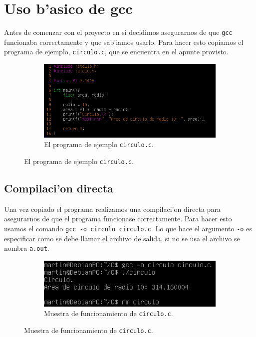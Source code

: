 \documentclass[11pt]{article}
\begin{document}
		
	\section{Uso b'asico de gcc}
		Antes de comenzar con el proyecto en si decidimos asegurarnos de que \texttt{gcc} funcionaba correctamente y que sab'iamos usarlo. Para hacer esto copiamos el programa de ejemplo, \texttt{circulo.c}, que se encuentra en el apunte provisto.
		
		\begin{figure}[H]
			\centering
			\begin{subfigure}[b!]{0.7\linewidth}
				\includegraphics[width=\linewidth]{Images/Seccion 1/S1.PNG}
				\caption*{El programa de ejemplo \texttt{circulo.c}.}
			\end{subfigure}
		\end{figure}
		
	\subsection{Compilaci'on directa}
		Una vez copiado el programa realizamos una compilaci'on directa para asegurarnos de que el programa funcionase correctamente. Para hacer esto usamos el comando \texttt{gcc -o circulo circulo.c}. Lo que hace el argumento \texttt{-o} es especificar como se debe llamar el archivo de salida, si no se usa el archivo se nombra \texttt{a.out}.
		
		\begin{figure}[H]
			\centering
			\begin{subfigure}[b!]{0.7\linewidth}
				\includegraphics[width=\linewidth]{Images/Seccion 1/S1 parte dos.PNG}
				\caption*{Muestra de funcionamiento de \texttt{circulo.c}.}
			\end{subfigure}
		\end{figure}
		
\end{document}

